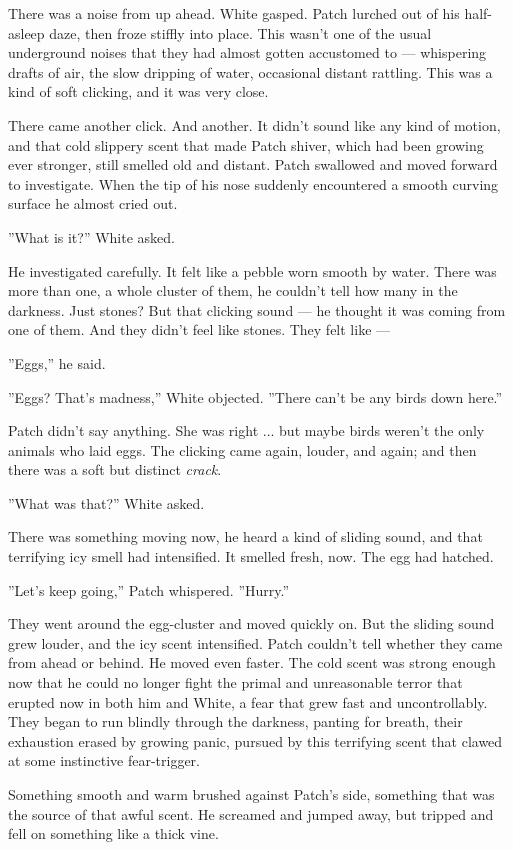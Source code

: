 \documentclass[12pt]{book}
\begin{document}
There was a noise from up ahead. White gasped. Patch lurched out of his half-asleep daze, then froze stiffly into place. This wasn't one of the usual underground noises that they had almost gotten accustomed to ---
whispering drafts of air, the slow dripping of water, occasional distant rattling. This was a kind of soft clicking, and it was very close. 

There came another click. And another. It didn't sound like any kind of motion, and that cold slippery scent that made Patch shiver, which had been growing ever stronger, still smelled old and distant. Patch swallowed and moved forward to investigate. When the tip of his nose suddenly encountered a smooth curving surface he almost cried out.

''What is it?'' White asked.

He investigated carefully. It felt like a pebble worn smooth by water. There was more than one, a whole cluster of them, he couldn't tell how many in the darkness. Just stones? But that clicking sound ---
he thought it was coming from one of them. And they didn't feel like stones. They felt like ---

''Eggs,'' he said.

''Eggs? That's madness,'' White objected. ''There can't be any birds down here.''

Patch didn't say anything. She was right ... but maybe birds weren't the only animals who laid eggs. The clicking came again, louder, and again; and then there was a soft but distinct {\it crack}.

''What was that?'' White asked.

There was something moving now, he heard a kind of sliding sound, and that terrifying icy smell had intensified. It smelled fresh, now. The egg had hatched.

''Let's keep going,'' Patch whispered. ''Hurry.''

They went around the egg-cluster and moved quickly on. But the sliding sound grew louder, and the icy scent intensified. Patch couldn't tell whether they came from ahead or behind. He moved even faster. The cold scent was strong enough now that he could no longer fight the primal and unreasonable terror that erupted now in both him and White, a fear that grew fast and uncontrollably. They began to run blindly through the darkness, panting for breath, their exhaustion erased by growing panic, pursued by this terrifying scent that clawed at some instinctive fear-trigger.

Something smooth and warm brushed against Patch's side, something that was the source of that awful scent. He screamed and jumped away, but tripped and fell on something like a thick vine.
\end{document}
